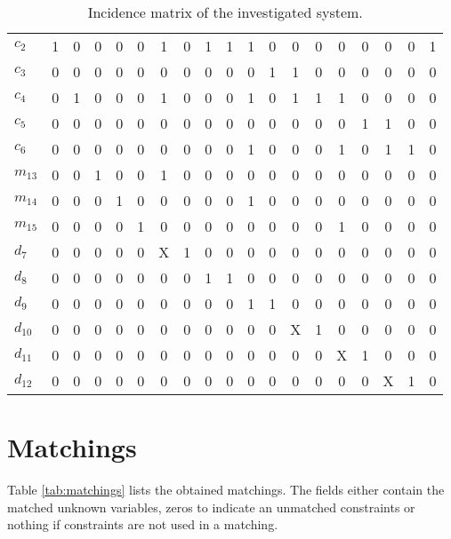 \documentclass[a4,11pt]{article}
\begin{document}
\begin{table}[!htb]
\begin{tabular}{|l|ccccc|ccccccccccccc|}
$c_2$  & 1 & 0 & 0 & 0 & 0 & 1 & 0 & 1 & 1 & 1 & 0 & 0 & 0 & 0 & 0 & 0 & 0 & 1 \\ 
$c_3$  & 0 & 0 & 0 & 0 & 0 & 0 & 0 & 0 & 0 & 0 & 1 & 1 & 0 & 0 & 0 & 0 & 0 & 0 \\ 
$c_4$  & 0 & 1 & 0 & 0 & 0 & 1 & 0 & 0 & 0 & 1 & 0 & 1 & 1 & 1 & 0 & 0 & 0 & 0 \\ 
$c_5$  & 0 & 0 & 0 & 0 & 0 & 0 & 0 & 0 & 0 & 0 & 0 & 0 & 0 & 0 & 1 & 1 & 0 & 0 \\ 
$c_6$  & 0 & 0 & 0 & 0 & 0 & 0 & 0 & 0 & 0 & 1 & 0 & 0 & 0 & 1 & 0 & 1 & 1 & 0 \\ 
$m_{13}$  & 0 & 0 & 1 & 0 & 0 & 1 & 0 & 0 & 0 & 0 & 0 & 0 & 0 & 0 & 0 & 0 & 0 & 0 \\ 
$m_{14}$  & 0 & 0 & 0 & 1 & 0 & 0 & 0 & 0 & 0 & 1 & 0 & 0 & 0 & 0 & 0 & 0 & 0 & 0 \\ 
$m_{15}$  & 0 & 0 & 0 & 0 & 1 & 0 & 0 & 0 & 0 & 0 & 0 & 0 & 0 & 1 & 0 & 0 & 0 & 0 \\ 
\hline
$d_7$  & 0 & 0 & 0 & 0 & 0 & X & 1 & 0 & 0 & 0 & 0 & 0 & 0 & 0 & 0 & 0 & 0 & 0 \\ 
$d_8$  & 0 & 0 & 0 & 0 & 0 & 0 & 0 & 1 & 1 & 0 & 0 & 0 & 0 & 0 & 0 & 0 & 0 & 0 \\ 
$d_9$  & 0 & 0 & 0 & 0 & 0 & 0 & 0 & 0 & 0 & 1 & 1 & 0 & 0 & 0 & 0 & 0 & 0 & 0 \\ 
$d_{10}$  & 0 & 0 & 0 & 0 & 0 & 0 & 0 & 0 & 0 & 0 & 0 & X & 1 & 0 & 0 & 0 & 0 & 0 \\ 
$d_{11}$  & 0 & 0 & 0 & 0 & 0 & 0 & 0 & 0 & 0 & 0 & 0 & 0 & 0 & X & 1 & 0 & 0 & 0 \\ 
$d_{12}$  & 0 & 0 & 0 & 0 & 0 & 0 & 0 & 0 & 0 & 0 & 0 & 0 & 0 & 0 & 0 & X & 1 & 0 \\ \hline
\end{tabular}
\caption{Incidence matrix of the investigated system.}
\label{tab:matrix}
\end{table}
\newpage
\section{Matchings}
Table \ref{tab:matchings} lists the obtained matchings. The fields either contain the matched unknown variables, zeros to indicate an unmatched constraints or nothing if constraints are not used in a matching.\setlength\tabcolsep{2mm}
\end{document}
